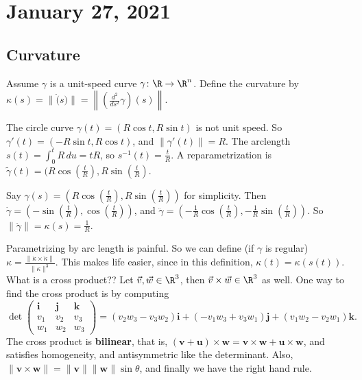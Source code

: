 \section{January 27, 2021}
\subsection{Curvature}
\begin{definition}[]
Assume $\gamma $ is a unit-speed curve $\gamma \colon \R \to \R^n $. Define the curvature by $\kappa(s)= \| \ddot (s)\|= \left\| \left( \frac{d^2}{ds^2}\gamma  \right) (s)\right\|$.
\end{definition}
\begin{example}
    The circle curve $\gamma (t)= (R \cos t, R \sin t)$ is not unit speed. So $\gamma '(t)= (-R \sin t, R \cos t)$, and $\| \gamma '(t)\|=R$. The arclength $s(t)= \int_{0}^{t} R \, du=tR$, so $s ^{-1} (t) = \frac{t}{R}$. A reparametrization is $\widetilde \gamma (t)= (R \cos \left( \frac{t}{R} \right) , R \sin \left( \frac{t}{R} \right) $. 

    Say $\gamma (s)= \left(R \cos \left( \frac{t}{R} \right) , R \sin \left( \frac{t}{R} \right) \right)$ for simplicity. Then $\dot \gamma = \left(- \sin \left( \frac{t}{R} \right) , \cos \left( \frac{t}{R} \right) \right)$, and $\ddot \gamma = \left( -\frac{1}{R}\cos \left( \frac{t}{R} \right) , -\frac{1}{R}\sin \left( \frac{t}{R} \right)  \right) .$ So $\| \ddot \gamma\|=\kappa(s)=\frac{1}{R}$.
\end{example}
Parametrizing by arc length is painful. So we can define (if $\gamma $ is regular) $\kappa = \frac{\|\dot \kappa \times  \ddot \kappa\|}{\| \kappa\|^3}.$ This makes life easier, since in this definition, $\kappa(t)= \kappa(s(t))$. What is a cross product?? Let $\vec v, \vec w \in \R^3$, then $\vec v \times  \vec w \in \R^3$ as well. One way to find the cross product is by computing \[
\det 
\begin{pmatrix}
    \mathbf i & \mathbf j & \mathbf k \\
    v_1 & v_2 & v_3 \\
    w_1 & w_2 & w_3
\end{pmatrix}=(v_2w_3-v_3w_2) \mathbf i + (-v_1w_3+v_3w_1) \mathbf j+(v_1w_2-v_2w_1) \mathbf k.
\] The cross product is \textbf{bilinear}, that is, $(\mathbf v+\mathbf u)\times \mathbf w= \mathbf v \times \mathbf w+\mathbf u\times \mathbf w$, and satisfies homogeneity, and antisymmetric like the determinant. Also, $\|\mathbf v\times \mathbf w\|= \|\mathbf v\|\|\mathbf w\|\sin \theta$, and finally we have the right hand rule.

